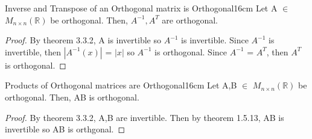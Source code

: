     \newpage



    \begin{corollary}{Inverse and Transpose of an Orthogonal matrix
    is Orthogonal}{16cm}
        Let A $\in$ $M_{n \times n}(\mathbb{R})$ be orthogonal.
        Then, $A^{-1},A^T$ are orthogonal.
    \end{corollary}

    \begin{proof}
        By {\color{red} theorem 3.3.2}, A is invertible so $A^{-1}$ is invertible.
        Since $A^{-1}$ is invertible, then $|A^{-1}(x)|$ = $|x|$
        so $A^{-1}$ is orthogonal.
        Since $A^{-1}$ = $A^T$, then $A^T$ is orthogonal.
    \end{proof}

    \vspace{0.5cm}



    \begin{corollary}{Products of Orthogonal matrices are Orthogonal}{16cm}
        Let A,B $\in$ $M_{n \times n}(\mathbb{R})$ be orthogonal.
        Then, AB is orthogonal.
    \end{corollary}

    \begin{proof}
        By {\color{red} theorem 3.3.2}, A,B are invertible.
        Then by {\color{red} theorem 1.5.13}, AB is invertible
        so AB is orthgonal.
    \end{proof}

    \vspace{0.5cm}

























